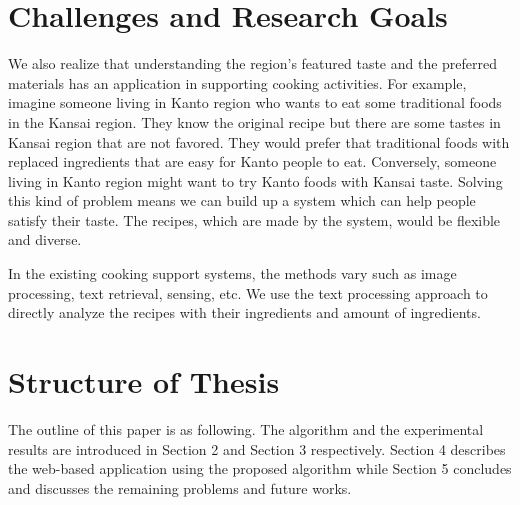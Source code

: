 \section{Challenges and Research Goals}\label{sec:challenge}

\par We also realize that understanding the region's featured taste and the preferred materials has an application in supporting cooking activities. For example, imagine someone living in Kanto region who wants to eat some traditional foods in the Kansai region. They know the original recipe but there are some tastes in Kansai region that are not favored. They would prefer that traditional foods with replaced ingredients that are easy for Kanto people to eat. Conversely, someone living in Kanto region might want to try Kanto foods with Kansai taste. Solving this kind of problem means we can build up a system which can help people satisfy their taste. The recipes, which are made by the system, would be flexible and diverse.
\par In the existing cooking support systems, the methods vary such as image processing, text retrieval, sensing, etc. We use the text processing approach to directly analyze the recipes with their ingredients and amount of ingredients. 

\section{Structure of Thesis}\label{sec:intro_structure}
\par The outline of this paper is as following. The algorithm and the experimental results are introduced in Section 2 and Section 3 respectively. Section 4 describes the web-based application using the proposed algorithm while Section 5 concludes and discusses the remaining problems and future works. 